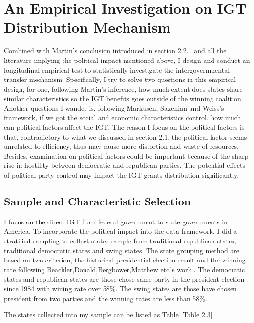 \section{An Empirical Investigation on IGT Distribution Mechanism}
Combined with Martin's \cite{martin2018dividing} conclusion introduced in section 2.2.1 and all the literature implying the political impact mentioned above, I design and conduct an longitudinal empirical test to statistically investigate the intergovernmental transfer mechanism. Specifically, I try to solve two questions in this empirical design, for one, following Martin's inference, how much extent does states share similar characteristics so the IGT benefits goes outside of the winning coalition. Another questions I wander is, following Markusen, Saxenian and Weiss's framework, if we got the social and economic characteristics control, how much can political factors affect the IGT. The reason I focus on the political factors is that, contradictory to what we discussed in section 2.1, the political factor seems unrelated to efficiency, thus may cause more distortion and waste of resources. Besides, examination on political factors could be important because of the sharp rise in hostility between democratic and republican parties. The potential effects of political party control may impact the IGT grants distribution significantly.

\subsection{Sample and Characteristic Selection}
I focus on the direct IGT from federal government to state governments in America. To incorporate the political impact into the data framework, I did a stratified sampling to collect states sample from traditional republican states, traditional democratic states and swing states.
The state grouping method are based on two criterion, the historical presidential election result and the winning rate following Beachler,Donald,Bergbower,Matthew etc.'s work \cite{beachler2015presidential}. The democratic states and republican states are those chose same party in the president election since 1984 with wining rate over 58\%. The swing states are those have chosen president from two parties and the winning rates are less than 58\%.

The states collected into my sample can be listed as Table \ref*{Table 2.3}

